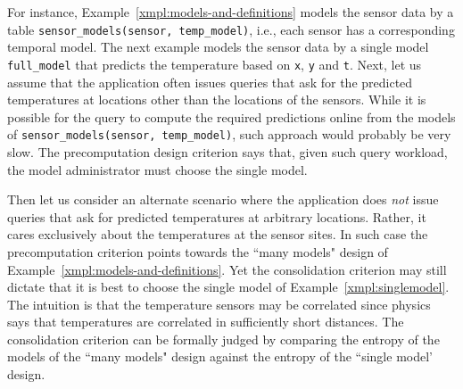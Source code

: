 \begin{example}
\label{xmpl:design-choices}
For instance, Example~\ref{xmpl:models-and-definitions} models the sensor data by a table \texttt{sensor\_models(sensor, temp\_model)}, i.e., each sensor has a corresponding temporal model. The next example models the sensor data by a single model \texttt{full\_model} that predicts the temperature based on \texttt{x}, \texttt{y} and \texttt{t}. Next, let us assume that the application often issues queries that ask for the predicted temperatures at locations other than the locations of the sensors. While it is possible for the query to compute the required predictions online from the models of  \texttt{sensor\_models(sensor, temp\_model)}, such approach would probably be very slow. The precomputation design criterion says that, given such query workload, the model administrator must choose the single model.

Then let us consider an alternate scenario where the application does {\em not} issue queries that ask for predicted temperatures at arbitrary locations. Rather, it cares exclusively about the temperatures at the sensor sites. In such case the precomputation criterion points towards the ``many models" design of Example~\ref{xmpl:models-and-definitions}. Yet the consolidation criterion may still dictate that it is best to choose the single model of Example~\ref{xmpl:singlemodel}. The intuition is that the temperature sensors may be correlated since physics says that temperatures are correlated in sufficiently short distances. The consolidation criterion can be formally judged by comparing the entropy of the models of the ``many models" design against the entropy of the ``single model' design.
\end{example}



